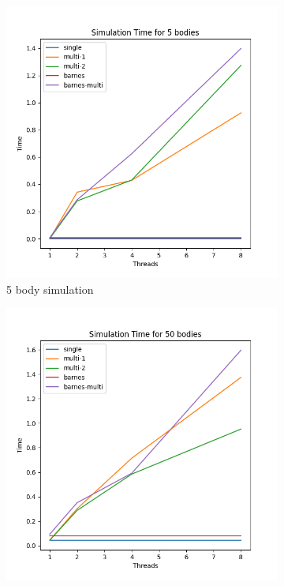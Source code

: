 \documentclass[12pt]{article}
\begin{document}
\begin{figure}[hbt!]
    \centering
    \begin{subfigure}[b]{0.41\textwidth}
        \centering
        \includegraphics[width=\textwidth]{simulation/simulation_time_5.png}
        \caption{5 body simulation}
        \label{figure:5-body}
    \end{subfigure}
    \hfill
    \begin{subfigure}[b]{0.41\textwidth}
        \centering
        \includegraphics[width=\textwidth]{simulation/simulation_time_50.png}

\end{subfigure}
\end{figure}
\end{document}
